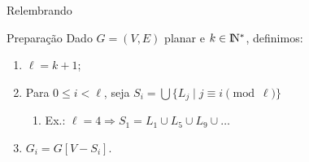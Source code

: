 \begin{frame}{Relembrando}
    \begin{minipage}{\linewidth}
        \centering
    \end{minipage}
\end{frame}

\begin{frame}{Preparação}
    Dado $G=(V, E)$ planar e $k \in \rm I\!N^*$, definimos:
    \pause
    \begin{enumerate}[-]
        \item $\ell = k+1$;
        \item Para $0 \le i < \ell$, seja $S_i = \bigcup \{L_j \mid j \equiv i \pmod \ell\}$
        \begin{enumerate}[-]
            \item Ex.: $\ell = 4 \Rightarrow S_1 = L_1 \cup L_5 \cup L_9 \cup \dots$
        \end{enumerate}
        \item $G_i = G[V - S_i]$.
    \end{enumerate}
\end{frame}

